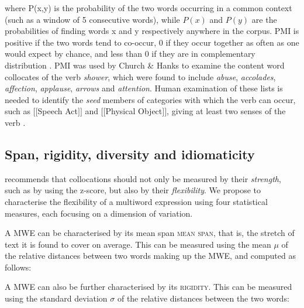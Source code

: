 \documentclass[output=paper]{langsci/langscibook}
\begin{document}
\noindent  where P(x,y) is the probability of the two words occurring in a common
context (such as a window of 5 consecutive words), while $P(x)$ and $P(y)$
are the probabilities of finding words x and y respectively anywhere in
the corpus. PMI is positive if the two words tend to co-occur, 0 if
they occur together as often as one would expect by chance, and less
than 0 if they are in complementary distribution \citep{church1989}.  PMI was used by Church \& Hanks to examine the content word
collocates of the verb \textit{shower}, which were found to include \textit{abuse},
\textit{accolades}, \textit{affection}, \textit{applause}, \textit{arrows} and \textit{attention}. Human
examination of these lists is needed to identify the \textit{seed} members of
categories with which the verb can occur, such as $[$$[$Speech Act$]$$]$ and
$[$$[$Physical Object$]$$]$, giving at least two senses of the verb \citep{hanks2012}. 

\subsection{Span, rigidity, diversity and idiomaticity}

\cite{smadja1993} recommends that collocations should not only be measured
by their \textit{strength}, such as by using the z-score,
but also by their \textit{flexibility}. We propose to
characterise the flexibility of a multiword expression using four
statistical measures, each focusing on a dimension of variation.


A MWE can be characterised by its mean span \textsc{mean span}, that is,
the stretch of text it is found to cover on average. This can be
measured using the mean  $\mu$ of the relative distances between two
words making up the MWE, and computed as follows:
 




A MWE can also be further characterised by its
 \textsc{rigidity}. This can be measured using the standard
deviation  $\sigma$ of the relative distances between the two words: 


\end{document}
